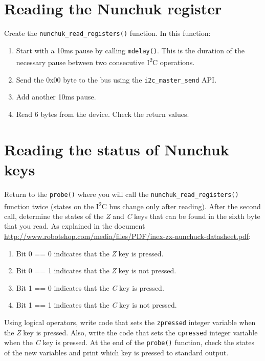 \documentclass[11pt]{article}
\begin{document}
\section{Reading the Nunchuk register}
Create the \texttt{nunchuk\_read\_registers()} function. In this function:
\begin{enumerate}
	\item Start with a 10ms pause by calling \texttt{mdelay()}. This is the
		duration of the necessary pause between two consecutive
		I\textsuperscript{2}C operations.
	\item Send the 0x00 byte to the bus using the \texttt{i2c\_master\_send}
		API.
	\item Add another 10ms pause.
	\item Read 6 bytes from the device. Check the return values.
\end{enumerate}

\section{Reading the status of Nunchuk keys}
Return to the \texttt{probe()} where you will call the
\texttt{nunchuk\_read\_registers()} function twice (states on the
I\textsuperscript{2}C bus change only after reading).
After the second call, determine the states of the \textit{Z} and
\textit{C} keys that can be found in the sixth byte that you read.
\newline
\newline
As explained in the document
\url{http://www.robotshop.com/media/files/PDF/inex-zx-nunchuck-datasheet.pdf}:
\begin{enumerate}
	\item Bit 0 == 0 indicates that the \textit{Z} key is pressed.
	\item Bit 0 == 1 indicates that the \textit{Z} key is not pressed.
	\item Bit 1 == 0 indicates that the \textit{C} key is pressed.
	\item Bit 1 == 1 indicates that the \textit{C} key is not pressed.
\end{enumerate}
Using logical operators, write code that sets the \texttt{zpressed} integer
variable when the \textit{Z} key is pressed. Also, write the code that sets the
\texttt{cpressed} integer variable when the \textit{C} key is pressed.
\newline
\newline
At the end of the \texttt{probe()} function, check the states of the new
variables and print which key is pressed to standard output.
\end{document}
